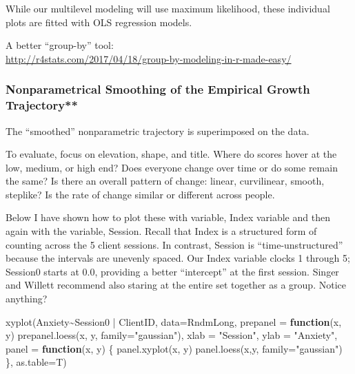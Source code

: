\documentclass[
  english,
]{book}
\newenvironment{Shaded}{\begin{snugshade}}{\end{snugshade}}
\newcommand{\AttributeTok}[1]{\textcolor[rgb]{0.77,0.63,0.00}{#1}}
\newcommand{\ControlFlowTok}[1]{\textcolor[rgb]{0.13,0.29,0.53}{\textbf{#1}}}
\newcommand{\FunctionTok}[1]{\textcolor[rgb]{0.00,0.00,0.00}{#1}}
\newcommand{\NormalTok}[1]{#1}
\newcommand{\SpecialCharTok}[1]{\textcolor[rgb]{0.00,0.00,0.00}{#1}}
\newcommand{\StringTok}[1]{\textcolor[rgb]{0.31,0.60,0.02}{#1}}
\begin{document}
While our multilevel modeling will use maximum likelihood, these individual plots are fitted with OLS regression models.

A better ``group-by'' tool:\\
\url{http://r4stats.com/2017/04/18/group-by-modeling-in-r-made-easy/}

\hypertarget{nonparametrical-smoothing-of-the-empirical-growth-trajectory}{%
\subsubsection{Nonparametrical Smoothing of the Empirical Growth Trajectory**}\label{nonparametrical-smoothing-of-the-empirical-growth-trajectory}}

The ``smoothed'' nonparametric trajectory is superimposed on the data.

To evaluate, focus on elevation, shape, and title. Where do scores hover at the low, medium, or high end? Does everyone change over time or do some remain the same? Is there an overall pattern of change: linear, curvilinear, smooth, steplike? Is the rate of change similar or different across people.

Below I have shown how to plot these with variable, Index variable and then again with the variable, Session. Recall that Index is a structured form of counting across the 5 client sessions. In contrast, Session is ``time-unstructured'' because the intervals are unevenly spaced. Our Index variable clocks 1 through 5; Session0 starts at 0.0, providing a better ``intercept'' at the first session. Singer and Willett \citeyearpar{singer_applied_2003} recommend also staring at the entire set together as a group. Notice anything?

\begin{Shaded}
\begin{Highlighting}[]
\FunctionTok{xyplot}\NormalTok{(Anxiety}\SpecialCharTok{\textasciitilde{}}\NormalTok{Session0 }\SpecialCharTok{|}\NormalTok{ ClientID, }\AttributeTok{data=}\NormalTok{RndmLong,}
  \AttributeTok{prepanel =} \ControlFlowTok{function}\NormalTok{(x, y) }\FunctionTok{prepanel.loess}\NormalTok{(x, y, }\AttributeTok{family=}\StringTok{"gaussian"}\NormalTok{),}
  \AttributeTok{xlab =} \StringTok{"Session"}\NormalTok{, }\AttributeTok{ylab =} \StringTok{"Anxiety"}\NormalTok{,}
  \AttributeTok{panel =} \ControlFlowTok{function}\NormalTok{(x, y) \{}
  \FunctionTok{panel.xyplot}\NormalTok{(x, y)}
  \FunctionTok{panel.loess}\NormalTok{(x,y, }\AttributeTok{family=}\StringTok{"gaussian"}\NormalTok{) \},}
   \AttributeTok{as.table=}\NormalTok{T)}
\end{Highlighting}
\end{Shaded}
\end{document}
